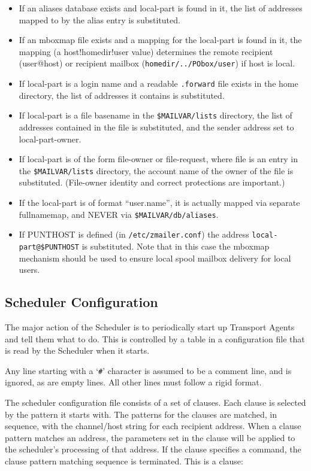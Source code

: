 \begin{itemize}
\item If an aliases database exists and local-part is found in it, the list of
addresses mapped to by the alias entry is substituted.
\item If an mboxmap file exists and a mapping for the local-part is found in it,
the mapping (a host!homedir!user value) determines the remote recipient
(user@host) or recipient mailbox ({\tt homedir/../PObox/user}) if host 
is local.
\item If local-part is a login name and a readable {\tt .forward} file 
exists in the home directory, the list of addresses it contains is substituted.
\item If local-part is a file basename in the {\tt \$MAILVAR/lists} 
directory, the   list of addresses contained in the file is substituted, and 
the sender address set to local-part-owner.
\item If local-part is of the form file-owner or file-request, where file is
an entry in the {\tt \$MAILVAR/lists} directory, the account name 
of the owner of the file is substituted.   (File-owner identity and correct 
protections are important.)
\item If the local-part is of format  ``user.name'',  it is actually mapped via
separate   fullnamemap, and NEVER via {\tt \$MAILVAR/db/aliases}.
\item If PUNTHOST is defined (in {\tt /etc/zmailer.conf}) the address
{\tt local-part@\$PUNTHOST} is substituted.  Note that in this case
the mboxmap mechanism should be used to ensure local spool
mailbox delivery for local users.
\end{itemize}


\subsection{Scheduler Configuration}


The major action of the Scheduler is to periodically start up Transport
Agents and tell them what to do.  This is controlled by a table in a
configuration file that is read by the Scheduler when it starts.  

Any line starting with a `{\tt \#}' character is assumed to be a comment 
line, and is ignored, as are empty lines.  All other lines must follow a rigid
format. 

The scheduler configuration file consists of a set  of
clauses. Each clause is selected by the pattern it starts
with. The patterns  for  the  clauses   are  matched,  in
sequence, with the channel/host string for each recipient
address. When a clause pattern matches  an  address,  the
parameters set in the clause will be applied to the scheduler's 
processing of that address. If the clause specifies a command,  
the clause pattern matching sequence is terminated. This is a clause:

